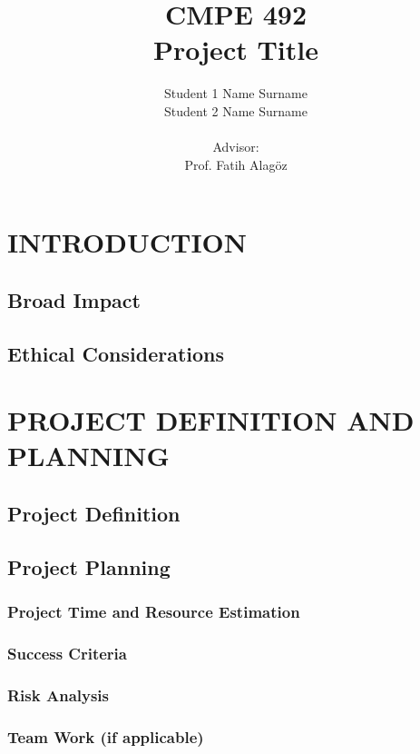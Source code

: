\documentclass[a4paper,12pt]{report}
\begin{document}
\title{CMPE 492 \\ Project Title}
\author{
Student 1 Name Surname \\
Student 2 Name Surname \\ \\
Advisor: \\ 
Prof. Fatih Alagöz
}
\date{}
\maketitle{}
\tableofcontents

\chapter{INTRODUCTION}

\section{Broad Impact}
\section{Ethical Considerations}

\chapter{PROJECT DEFINITION AND PLANNING}
\section{Project Definition}
\section{Project Planning}
\subsection{Project Time and Resource Estimation}
\subsection{Success Criteria}
\subsection{Risk Analysis}
\subsection{Team Work (if applicable)}
\end{document}
